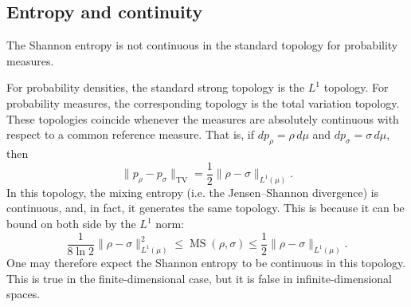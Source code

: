 \subsection{Entropy and continuity}\label{pm-es-lessonEntropyContinuity}

\begin{insight}
	The Shannon entropy is not continuous in the standard topology for probability measures.
\end{insight}

For probability densities, the standard strong topology is the $L^1$ topology. For probability measures, the corresponding topology is the total variation topology. These topologies coincide whenever the measures are absolutely continuous with respect to a common reference measure. That is, if $dp_\rho=\rho\,d\mu$ and $dp_\sigma=\sigma\,d\mu$, then
\begin{equation}
	\|p_\rho-p_\sigma\|_{\mathrm{TV}}
	=
	\frac{1}{2}\|\rho-\sigma\|_{L^1(\mu)}.
\end{equation}
In this topology, the mixing entropy (i.e. the Jensen--Shannon divergence) is continuous, and, in fact, it generates the same topology. This is because it can be bound on both side by the $L^1$ norm: 
\begin{equation}
	\frac{1}{8\ln 2}\|\rho-\sigma\|_{L^1(\mu)}^2
	\leq
	\operatorname{MS}(\rho,\sigma)
	\leq
	\frac{1}{2}\|\rho-\sigma\|_{L^1(\mu)}.
\end{equation}
One may therefore expect the Shannon entropy to be continuous in this topology. This is true in the finite-dimensional case, but it is false in infinite-dimensional spaces.

